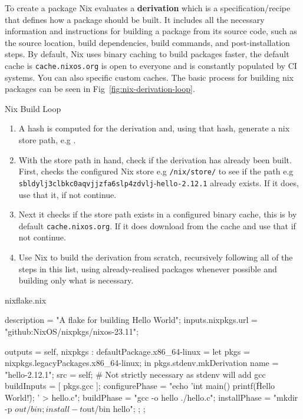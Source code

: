 To create a package Nix evaluates a \textbf{derivation} which is a specification/recipe that defines how a package should be built. It includes all the necessary information and instructions for building a package from its source code, such as the source location, build dependencies, build commands, and post-installation steps. By default, Nix uses binary caching to build packages faster, the default cache is \texttt{cache.nixos.org} is open to everyone and is constantly populated by CI systems. You can also specific custom caches. The basic process for building nix packages can be seen in Fig~\ref{fig:nix-derivation-loop}.

\begin{figureBox}[label = {fig:nix-derivation-loop}]{Nix Build Loop}
\begin{enumerate}
    \item A hash is computed for the derivation and, using that hash, generate a nix store path, e.g .
    \item  With the store path in hand, check if the derivation has already been built. First, checks the configured Nix store e.g {\color{Purple}\texttt{/nix/store/}} to see if the path e.g {\color{RoyalBlue}\texttt{sbldylj3clbkc0aqvjjzfa6slp4zdvlj}}-{\color{Orange}\texttt{hello-2.12.1}} already exists. If it does, use that it, if not continue.
    \item Next it checks if the store path exists in a configured binary cache, this is by default \texttt{cache.nixos.org}. If it does download from the cache and use that if not continue.
    \item Use Nix to build the derivation from scratch, recursively following all of the steps in this list, using already-realised packages whenever possible and building only what is necessary. 
\end{enumerate}
\end{figureBox}


\begin{codeBox}[label = {fig:nix-flake}]{nix}{flake.nix}
{
  description = "A flake for building Hello World";
  inputs.nixpkgs.url = "github:NixOS/nixpkgs/nixos-23.11";

  outputs = { self, nixpkgs }: {
    defaultPackage.x86_64-linux =
      let
        pkgs = nixpkgs.legacyPackages.x86_64-linux;
      in
      pkgs.stdenv.mkDerivation {
        name = "hello-2.12.1";
        src = self;
        # Not strictly necessary as stdenv will add gcc
        buildInputs = [ pkgs.gcc ];
        configurePhase = "echo 'int main() { printf(\"Hello World!\"); }' > hello.c";
        buildPhase = "gcc -o hello ./hello.c";
        installPhase = "mkdir -p $out/bin; install -t $out/bin hello";
      };
  };
}
\end{codeBox}

